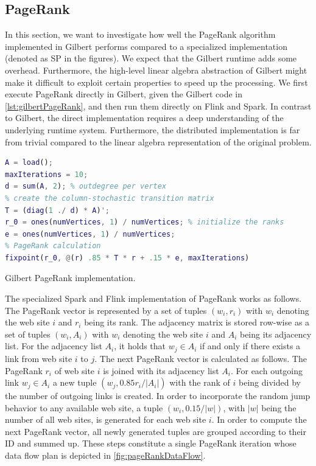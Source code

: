 \subsection{PageRank}

In this section, we want to investigate how well the PageRank algorithm~\cite{page:1999a} implemented in Gilbert performs compared to a specialized implementation (denoted as SP in the figures).
We expect that the Gilbert runtime adds some overhead.
Furthermore, the high-level linear algebra abstraction of Gilbert might make it difficult to exploit certain properties to speed up the processing.
We first execute PageRank directly in Gilbert, given the Gilbert code in \cref{lst:gilbertPageRank}, and then run them directly on Flink and Spark.
In contrast to Gilbert, the direct implementation requires a deep understanding of the underlying runtime system.
Furthermore, the distributed implementation is far from trivial compared to the linear algebra representation of the original problem.

\begin{listing}[htbp]
	\begin{lstlisting}[language=Matlab,
		commentstyle=\color{black},
		  stringstyle=\color{black},
		  keywordstyle=\color{black}\bfseries,
		  morekeywords={ones, fixpoint},
		  xleftmargin=.0\textwidth,
		  basicstyle=\footnotesize]
% load adjacency matrix
A = load();
maxIterations = 10;
d = sum(A, 2); % outdegree per vertex
% create the column-stochastic transition matrix
T = (diag(1 ./ d) * A)'; 
r_0 = ones(numVertices, 1) / numVertices; % initialize the ranks
e = ones(numVertices, 1) / numVertices;
% PageRank calculation
fixpoint(r_0, @(r) .85 * T * r + .15 * e, maxIterations)
	\end{lstlisting}
	\caption{Gilbert PageRank implementation.}
	\label{lst:gilbertPageRank}
\end{listing}

The specialized Spark and Flink implementation of PageRank works as follows.
The Page\-Rank vector is represented by a set of tuples $(w_i, r_i)$ with $w_i$ denoting the web site $i$ and $r_i$ being its rank.
The adjacency matrix is stored row-wise as a set of tuples $(w_i, A_i)$ with $w_i$ denoting the web site $i$ and $A_i$ being its adjacency list.
For the adjacency list $A_i$, it holds that $w_j \in A_i$ if and only if there exists a link from web site $i$ to $j$.
The next PageRank vector is calculated as follows.
The PageRank $r_i$ of web site $i$ is joined with its adjacency list $A_i$.
For each outgoing link $w_j \in A_i$ a new tuple $(w_j, 0.85r_i/\left|A_i\right|)$ with the rank of $i$ being divided by the number of outgoing links is created.
In order to incorporate the random jump behavior to any available web site, a tuple $(w_i, 0.15/|w|)$, with $|w|$ being the number of all web sites, is generated for each web site $i$.
In order to compute the next PageRank vector, all newly generated tuples are grouped according to their ID and summed up.
These steps constitute a single PageRank iteration whose data flow plan is depicted in \cref{fig:pageRankDataFlow}.

